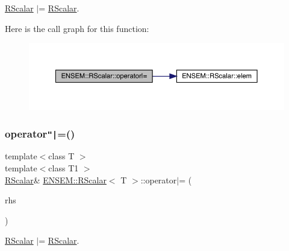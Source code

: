 \mbox{\hyperlink{classENSEM_1_1RScalar}{R\+Scalar}} $\vert$= \mbox{\hyperlink{classENSEM_1_1RScalar}{R\+Scalar}}. 

Here is the call graph for this function\+:
\nopagebreak
\begin{figure}[H]
\begin{center}
\leavevmode
\includegraphics[width=350pt]{d0/d8c/classENSEM_1_1RScalar_ad5838d1c3d7169f6cc7f9b78fe42ac59_cgraph}
\end{center}
\end{figure}
\mbox{\label{classENSEM_1_1RScalar_ad5838d1c3d7169f6cc7f9b78fe42ac59}} 
\subsubsection{\texorpdfstring{operator\texttt{"|}=()}{operator|=()}\hspace{0.1cm}{\footnotesize\ttfamily [2/3]}}
{\footnotesize\ttfamily template$<$class T $>$ \\
template$<$class T1 $>$ \\
\mbox{\hyperlink{classENSEM_1_1RScalar}{R\+Scalar}}\& \mbox{\hyperlink{classENSEM_1_1RScalar}{E\+N\+S\+E\+M\+::\+R\+Scalar}}$<$ T $>$\+::operator$\vert$= (\begin{DoxyParamCaption}\item[{const \mbox{\hyperlink{classENSEM_1_1RScalar}{R\+Scalar}}$<$ T1 $>$ \&}]{rhs }\end{DoxyParamCaption})\hspace{0.3cm}{\ttfamily [inline]}}



\mbox{\hyperlink{classENSEM_1_1RScalar}{R\+Scalar}} $\vert$= \mbox{\hyperlink{classENSEM_1_1RScalar}{R\+Scalar}}. 

